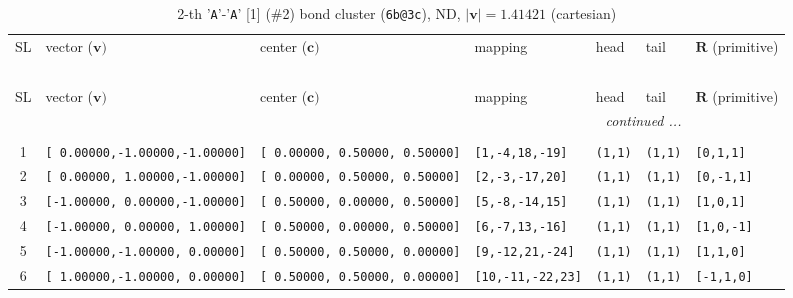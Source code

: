 \documentclass[fleqn,10pt,landscape]{jsarticle}
\begin{document}
\begin{longtable}[l]{cllllll}
\captionsetup{justification=raggedright, singlelinecheck=off}
\caption{2-th '\texttt{A}'-'\texttt{A}' [1] (\#2) bond cluster (\texttt{6b@3c}), ND, $|\bm{v}|=1.41421$ (cartesian)}
 \\
 \hline \hline
SL & vector ($\bm{v})$ & center ($\bm{c})$ & mapping & head & tail & $\bm{R}$ (primitive) \\ \hline \endfirsthead

\multicolumn{6}{l}{\tablename\ \thetable{}} \\
 \hline \hline
SL & vector ($\bm{v})$ & center ($\bm{c})$ & mapping & head & tail & $\bm{R}$ (primitive) \\ \hline \endhead

 \hline \hline
\multicolumn{6}{r}{\footnotesize\it continued ...} \\ \endfoot

 \hline \hline
\multicolumn{6}{r}{} \\ \endlastfoot

1 & \texttt{[ 0.00000,-1.00000,-1.00000]} & \texttt{[ 0.00000, 0.50000, 0.50000]} & \texttt{[1,-4,18,-19]} & \texttt{(1,1)} & \texttt{(1,1)} & \texttt{[0,1,1]} \\ \hline
2 & \texttt{[ 0.00000, 1.00000,-1.00000]} & \texttt{[ 0.00000, 0.50000, 0.50000]} & \texttt{[2,-3,-17,20]} & \texttt{(1,1)} & \texttt{(1,1)} & \texttt{[0,-1,1]} \\ \hline
3 & \texttt{[-1.00000, 0.00000,-1.00000]} & \texttt{[ 0.50000, 0.00000, 0.50000]} & \texttt{[5,-8,-14,15]} & \texttt{(1,1)} & \texttt{(1,1)} & \texttt{[1,0,1]} \\ \hline
4 & \texttt{[-1.00000, 0.00000, 1.00000]} & \texttt{[ 0.50000, 0.00000, 0.50000]} & \texttt{[6,-7,13,-16]} & \texttt{(1,1)} & \texttt{(1,1)} & \texttt{[1,0,-1]} \\ \hline
5 & \texttt{[-1.00000,-1.00000, 0.00000]} & \texttt{[ 0.50000, 0.50000, 0.00000]} & \texttt{[9,-12,21,-24]} & \texttt{(1,1)} & \texttt{(1,1)} & \texttt{[1,1,0]} \\ \hline
6 & \texttt{[ 1.00000,-1.00000, 0.00000]} & \texttt{[ 0.50000, 0.50000, 0.00000]} & \texttt{[10,-11,-22,23]} & \texttt{(1,1)} & \texttt{(1,1)} & \texttt{[-1,1,0]} \\
\end{longtable}
\end{document}
